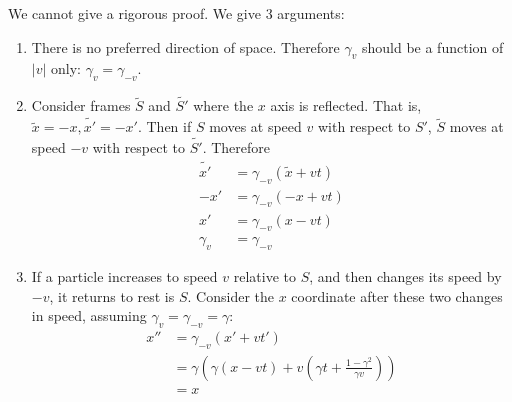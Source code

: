 \documentclass[../Main.tex]{subfiles}
\begin{document}
We cannot give a rigorous proof. We give 3 arguments:
\begin{enumerate}
    \item There is no preferred direction of space. Therefore $\gamma_v$ should be a function of $|v|$ only: $\gamma_v = \gamma_{-v}$.
    \item Consider frames $\tilde{S}$ and $\tilde{S'}$ where the $x$ axis is reflected. That is, $\tilde{x} = -x, \tilde{x'} = -x'$. Then if $S$ moves at speed $v$ with respect to $S'$, $\tilde{S}$ moves at speed $-v$ with respect to $\tilde{S'}$. Therefore
    \begin{align*}
        \tilde{x'} &= \gamma_{-v}(\tilde{x} + vt) \\
        -x' &= \gamma_{-v} (-x + vt) \\
        x' &= \gamma_{-v} (x - vt) \\
        \gamma_v &= \gamma_{-v}
    \end{align*}
    \item If a particle increases to speed $v$ relative to $S$, and then changes its speed by $-v$, it returns to rest is $S$. Consider the $x$ coordinate after these two changes in speed, assuming $\gamma_v = \gamma_{-v} = \gamma$:
        \begin{align*}
            x'' &= \gamma_{-v} (x' + vt') \\
            &= \gamma \left(\gamma (x - vt) + v\left(\gamma t + \frac{1 - \gamma^2}{\gamma v}\right)\right) \\
            &= x
        \end{align*}
\end{enumerate}
\end{document}
